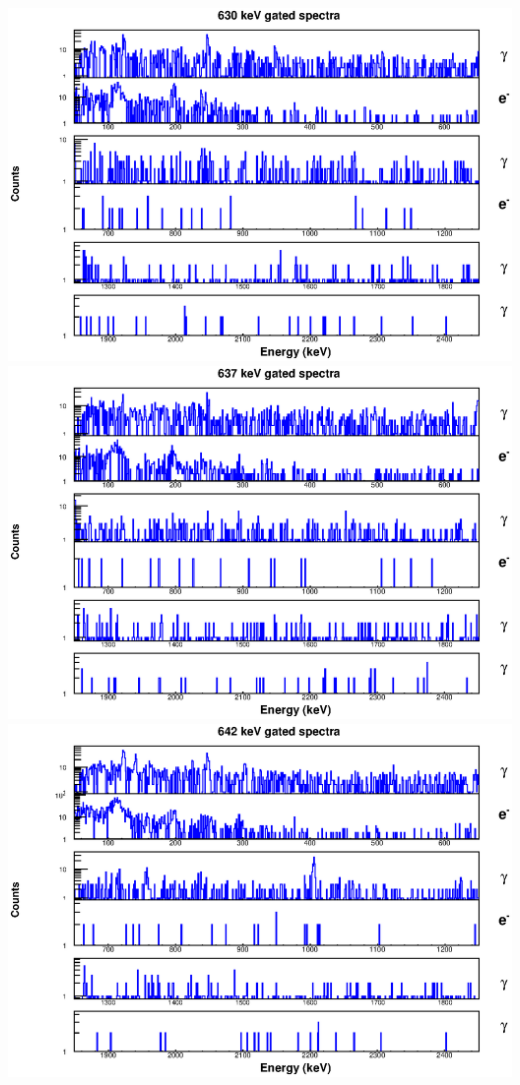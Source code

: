 \includegraphics[scale=0.8]{154Gd_Appendix/630_combined.eps}
\includegraphics[scale=0.8]{154Gd_Appendix/637_combined.eps}
\includegraphics[scale=0.8]{154Gd_Appendix/642_combined.eps}
